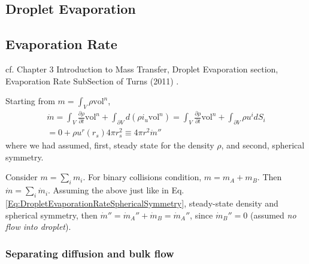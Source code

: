 \documentclass[10pt]{amsart}
\begin{document}
\begin{multicols*}{2}
\section{Droplet Evaporation}

\subsection{Evaporation Rate}

cf. Chapter 3 Introduction to Mass Transfer, Droplet Evaporation section, Evaporation Rate SubSection of Turns (2011) \cite{STurns2011}.  

Starting from $m = \int_V \rho \text{vol}^n$, 
\begin{equation}\label{Eq:DropletEvaporationRateSphericalSymmetry}
\begin{gathered}
  \dot{m} = \int_V \frac{ \partial \rho }{ \partial t} \text{vol}^n + \int_{ \partial V} d(\rho i_u \text{vol}^n ) = \int_V \frac{ \partial \rho}{ \partial t} \text{vol}^n + \int_{\partial V} \rho u^i dS_i \\
  = 0 + \rho u^r(r_s)4\pi r_s^2 \equiv 4\pi r^2 \dot{m}''
\end{gathered}
\end{equation}
where we had assumed, first, steady state for the density $\rho$, and second, spherical symmetry.

Consider $m = \sum_i m_i$.  For binary collisions condition, $m = m_A + m_B$.  Then \\
\phantom{Consider } $\dot{m} = \sum_i \dot{m}_i$.  Assuming the above just like in Eq. \ref{Eq:DropletEvaporationRateSphericalSymmetry}, steady-state density and spherical symmetry, then $\dot{m}'' = \dot{m}_A'' + \dot{m}_B = \dot{m}_A''$, since $\dot{m}_B'' =0$ (assumed \emph{no flow into droplet}).  

\subsubsection{Separating diffusion and bulk flow}


\end{multicols*}
\end{document}
